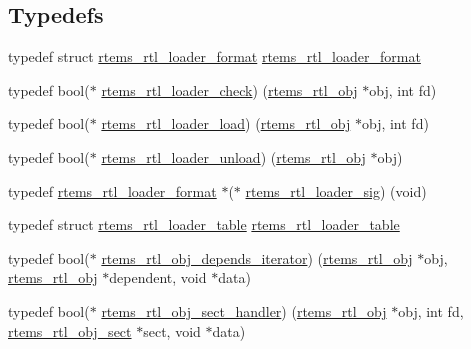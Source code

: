 \subsection*{Typedefs}
\begin{DoxyCompactItemize}
\item 
typedef struct \mbox{\hyperlink{structrtems__rtl__loader__format}{rtems\+\_\+rtl\+\_\+loader\+\_\+format}} \mbox{\hyperlink{rtl-obj_8h_a3742762af1639e494d0867c4344335a9}{rtems\+\_\+rtl\+\_\+loader\+\_\+format}}
\item 
typedef bool($\ast$ \mbox{\hyperlink{rtl-obj_8h_ae65589434f7dfc4ab547022bef414e04}{rtems\+\_\+rtl\+\_\+loader\+\_\+check}}) (\mbox{\hyperlink{structrtems__rtl__obj}{rtems\+\_\+rtl\+\_\+obj}} $\ast$obj, int fd)
\item 
typedef bool($\ast$ \mbox{\hyperlink{rtl-obj_8h_a6d119678fa2e324376060e8b09ea56cf}{rtems\+\_\+rtl\+\_\+loader\+\_\+load}}) (\mbox{\hyperlink{structrtems__rtl__obj}{rtems\+\_\+rtl\+\_\+obj}} $\ast$obj, int fd)
\item 
typedef bool($\ast$ \mbox{\hyperlink{rtl-obj_8h_afacdc84b4af0a65a15b4ef38ebef6ab0}{rtems\+\_\+rtl\+\_\+loader\+\_\+unload}}) (\mbox{\hyperlink{structrtems__rtl__obj}{rtems\+\_\+rtl\+\_\+obj}} $\ast$obj)
\item 
typedef \mbox{\hyperlink{structrtems__rtl__loader__format}{rtems\+\_\+rtl\+\_\+loader\+\_\+format}} $\ast$($\ast$ \mbox{\hyperlink{rtl-obj_8h_a31673e6af5ca5b1e8ccb074cfac376ba}{rtems\+\_\+rtl\+\_\+loader\+\_\+sig}}) (void)
\item 
typedef struct \mbox{\hyperlink{structrtems__rtl__loader__table}{rtems\+\_\+rtl\+\_\+loader\+\_\+table}} \mbox{\hyperlink{rtl-obj_8h_ab0b37adc773babd5318fdc28636b2eb2}{rtems\+\_\+rtl\+\_\+loader\+\_\+table}}
\item 
typedef bool($\ast$ \mbox{\hyperlink{rtl-obj_8h_a1465c9202902dfd2416e1d1432dab052}{rtems\+\_\+rtl\+\_\+obj\+\_\+depends\+\_\+iterator}}) (\mbox{\hyperlink{structrtems__rtl__obj}{rtems\+\_\+rtl\+\_\+obj}} $\ast$obj, \mbox{\hyperlink{structrtems__rtl__obj}{rtems\+\_\+rtl\+\_\+obj}} $\ast$dependent, void $\ast$data)
\item 
typedef bool($\ast$ \mbox{\hyperlink{rtl-obj_8h_a7af5827cf336da33eef4564a6e00ba11}{rtems\+\_\+rtl\+\_\+obj\+\_\+sect\+\_\+handler}}) (\mbox{\hyperlink{structrtems__rtl__obj}{rtems\+\_\+rtl\+\_\+obj}} $\ast$obj, int fd, \mbox{\hyperlink{structrtems__rtl__obj__sect}{rtems\+\_\+rtl\+\_\+obj\+\_\+sect}} $\ast$sect, void $\ast$data)
\end{DoxyCompactItemize}
